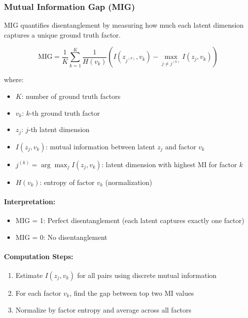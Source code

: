 \documentclass[conference]{IEEEtran}
\begin{document}
\subsubsection{Mutual Information Gap (MIG)}

MIG quantifies disentanglement by measuring how much each latent dimension captures a unique ground truth factor.

\begin{equation}
\text{MIG} = \frac{1}{K} \sum_{k=1}^{K} \frac{1}{H(v_k)} \left( I(z_{j^{(k)}}, v_k) - \max_{j \neq j^{(k)}} I(z_j, v_k) \right)
\end{equation}

where:
\begin{itemize}
    \item $K$: number of ground truth factors
    \item $v_k$: $k$-th ground truth factor
    \item $z_j$: $j$-th latent dimension
    \item $I(z_j, v_k)$: mutual information between latent $z_j$ and factor $v_k$
    \item $j^{(k)} = \arg\max_j I(z_j, v_k)$: latent dimension with highest MI for factor $k$
    \item $H(v_k)$: entropy of factor $v_k$ (normalization)
\end{itemize}

\paragraph{Interpretation:}
\begin{itemize}
    \item MIG = 1: Perfect disentanglement (each latent captures exactly one factor)
    \item MIG = 0: No disentanglement
\end{itemize}

\paragraph{Computation Steps:}
\begin{enumerate}
    \item Estimate $I(z_j, v_k)$ for all pairs using discrete mutual information
    \item For each factor $v_k$, find the gap between top two MI values
    \item Normalize by factor entropy and average across all factors
\end{enumerate}
\end{document}
